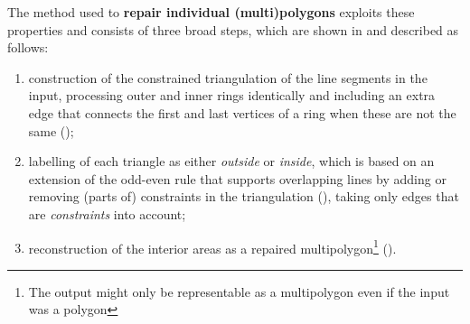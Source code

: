 The method used to \textbf{repair individual (multi)polygons} exploits these properties and consists of three broad steps, which are shown in  and described as follows:
\begin{enumerate}
  \item construction of the constrained triangulation of the line segments in the input, processing outer and inner rings identically and including an extra edge that connects the first and last vertices of a ring when these are not the same ();
  \item labelling of each triangle as either \emph{outside} or \emph{inside}, which is based on an extension of the odd-even rule that supports overlapping lines by adding or removing (parts of) constraints in the triangulation (), taking only edges that are \emph{constraints} into account;
  \item reconstruction of the interior areas as a repaired multipolygon\footnote{The output might only be representable as a multipolygon even if the input was a polygon} ().
\end{enumerate}
